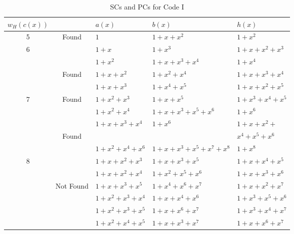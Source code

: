 \begin{table}[htbp]
		\caption{SCs and PCs for Code I}
		\centering
		\begin{tabularx}{0.48\textwidth}{|c|c|XXX} 
			\toprule
			$w_H(c(x))$&~& $a(x)$ & $b(x)$ & $h(x)$ \\ %
			\midrule
			5&Found&$1$ & $1+x+x^{2}$ & $1+x^2$\\
			\cline{1-5}
			6& ~&$1+x$ & $1+x^3$ & $1+x+x^2+x^3$\\
			&~ &$1+x^2$ & $1+x+x^3+x^4$ & $1+x^{4}$\\
			&Found&$1+x+x^2$ & $1+x^2+x^4$ & $1+x+x^3+x^4$\\
			&~&$1+x+x^3$ & $1+x^4+x^5$ & $1+x+x^2+x^5$\\
			\cline{1-5}
			7&Found&$1+x^2+x^3$ & $1+x+x^5$ & $1+x^3+x^4+x^5$\\
			&~&$1+x^2+x^4$ & $1+x+x^3+x^5+x^6$ & $1+x^{6}$\\			
			\cline{1-5}
			&~&$1+x+x^3+x^4$ & $1+x^6$ & $1+x+x^2+$\\
			&Found&&&$x^4+x^5+x^6$\\
			&~&$1+x^2+x^4+x^6$ & $1+x+x^3+x^5+x^7+x^8$ & $1+x^8$\\
			\cline{2-5}
			8&&$1+x+x^2+x^3$ 		&$1+x+x^3+x^5$ 		& $1+x+x^4+x^5$\\
			&&$1+x+x^2+x^4$ 		&$1+x^2+x^5+x^6$		& $1+x+x^3+x^6$\\
			&Not Found&$1+x+x^3+x^5$ 		&$1+x^4+x^6+x^7$ 		& $1+x+x^2+x^7$\\
			&&$1+x^2+x^3+x^4$ 	&$1+x+x^4+x^6$ 		& $1+x^3+x^5+x^6$\\
			&&$1+x^2+x^3+x^5$ 	&$1+x+x^6+x^7$ 		& $1+x^3+x^4+x^7$\\
			&&$1+x^2+x^4+x^5$ 	&$1+x+x^3+x^7$ 		& $1+x+x^6+x^7$\\
			\bottomrule
		\end{tabularx}		
		\label{code-tables-1}
	\end{table}


